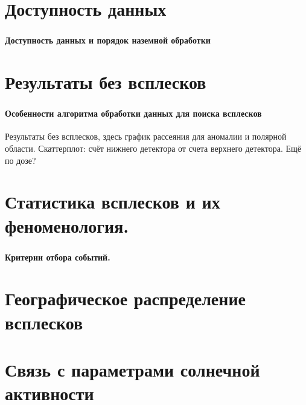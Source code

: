 \documentclass[t, aspectratio=43]{beamer}
\begin{document}
\section{Доступность данных}

\begin{frame}	
\frametitle{\insertsection} 
\framesubtitle{Доступность данных и порядок наземной обработки}

\end{frame}

\section{Результаты без всплесков}

\begin{frame}	
\frametitle{\insertsection} 
\framesubtitle{Особенности алгоритма обработки данных для поиска всплесков}
Результаты без всплесков, здесь график рассеяния для аномалии и
полярной области. Скаттерплот: счёт нижнего детектора от счета
верхнего детектора. Ещё по дозе?
\end{frame}

\section{Статистика всплесков и их феноменология. }

\begin{frame}	
\frametitle{\insertsection} 
\framesubtitle{Критерии отбора событий.}

\end{frame}

\section{Географическое распределение всплесков}

\begin{frame}	
\frametitle{\insertsection} 


\end{frame}

\section{Связь с параметрами солнечной активности}
\end{document}

